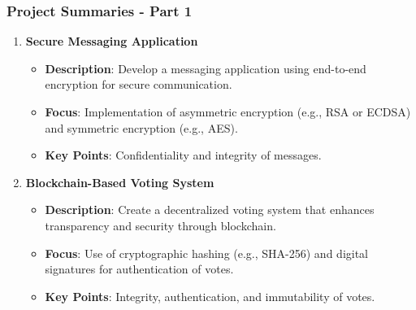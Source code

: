 \documentclass{beamer}
\begin{document}
\begin{frame}[fragile]
    \frametitle{Project Summaries - Part 1}
    \begin{enumerate}
        \item \textbf{Secure Messaging Application}
        \begin{itemize}
            \item \textbf{Description}: Develop a messaging application using end-to-end encryption for secure communication.
            \item \textbf{Focus}: Implementation of asymmetric encryption (e.g., RSA or ECDSA) and symmetric encryption (e.g., AES).
            \item \textbf{Key Points}: Confidentiality and integrity of messages. 
        \end{itemize}
        
        \item \textbf{Blockchain-Based Voting System}
        \begin{itemize}
            \item \textbf{Description}: Create a decentralized voting system that enhances transparency and security through blockchain.
            \item \textbf{Focus}: Use of cryptographic hashing (e.g., SHA-256) and digital signatures for authentication of votes.
            \item \textbf{Key Points}: Integrity, authentication, and immutability of votes.
        \end{itemize}
    \end{enumerate}
\end{frame}
\end{document}
